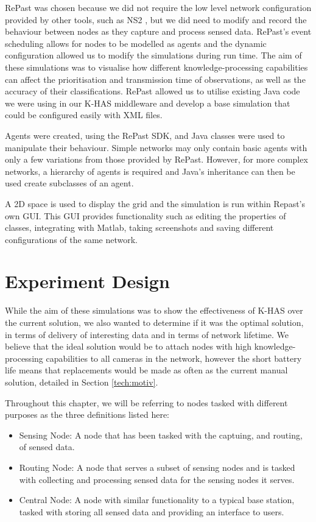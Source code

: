 RePast was chosen because we did not require the low level network configuration provided by other tools, such as NS2 \cite{mccanne1997network}, but we did need to modify and record the behaviour between nodes as they capture and process sensed data. RePast's event scheduling allows for nodes to be modelled as agents and the dynamic configuration allowed us to modify the simulations during run time. The aim of these simulations was to visualise how different knowledge-processing capabilities can affect the prioritisation and transmission time of observations, as well as the accuracy of their classifications. RePast allowed us to utilise existing Java code we were using in our K-HAS middleware and develop a base simulation that could be configured easily with XML files.

Agents were created, using the RePast SDK, and Java classes were used to manipulate their behaviour. Simple networks may only contain basic agents with only a few variations from those provided by RePast. However, for more complex networks, a hierarchy of agents is required and Java's inheritance can then be used create subclasses of an agent.

A 2D space is used to display the grid and the simulation is run within Repast's own GUI. This GUI provides functionality such as editing the properties of classes, integrating with Matlab, taking screenshots and saving different configurations of the same network.

\section{Experiment Design}\label{sim:imp}
	While the aim of these simulations was to show the effectiveness of K-HAS over the current solution, we also wanted to determine if it was the optimal solution, in terms of delivery of interesting data and in terms of network lifetime. We believe that the ideal solution would be to attach nodes with high knowledge-processing capabilities to all cameras in the network, however the short battery life means that replacements would be made as often as the current manual solution, detailed in Section \ref{tech:motiv}.

	Throughout this chapter, we will be referring to nodes tasked with different purposes as the three definitions listed here:
	\begin{itemize}
		\item Sensing Node: A node that has been tasked with the captuing, and routing, of sensed data.
		\item Routing Node: A node that serves a subset of sensing nodes and is tasked with collecting and processing sensed data for the sensing nodes it serves.
		\item Central Node: A node with similar functionality to a typical base station, tasked with storing all sensed data and providing an interface to users.
	\end{itemize}

